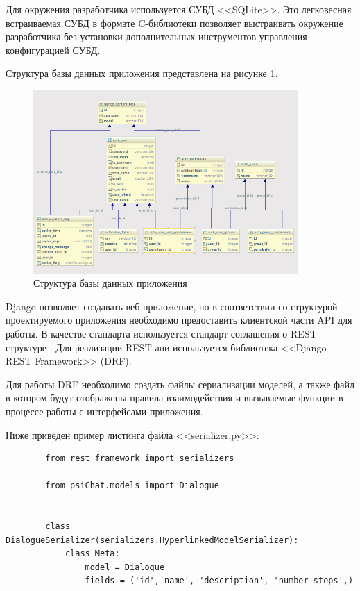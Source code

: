 Для окружения разработчика используется СУБД <<SQLite>>. Это легковесная встраиваемая СУБД в формате C-библиотеки позволяет выстраивать окружение разработчика без установки дополнительных инструментов управления конфигурацией СУБД.

Структура базы данных приложения представлена на рисунке \ref{fig:db}.

\begin{figure}[H]
    \centering
    \includegraphics[width=0.9\textwidth]{image/db_diagram.png}
    \caption{Структура базы данных приложения}
    \label{fig:db}
\end{figure}

Django позволяет создавать веб-приложение, но в соответствии со структурой проектируемого приложения необходимо предоставить клиентской части API для работы. В качестве стандарта используется стандарт соглашения о REST структуре \cite{richardson2008restful}. Для реализации  REST-апи используется библиотека <<Django REST Framework>> (DRF). 

Для работы DRF необходимо создать файлы сериализации моделей, а также файл в котором будут отображены правила взаимодействия и вызываемые функции в процессе работы с интерфейсами приложения. 

Ниже приведен пример листинга файла <<serializer.py>>:

\begin{minipage}{0.9\textwidth}
        \begin{verbatim}
        from rest_framework import serializers

        from psiChat.models import Dialogue
        
        
        class DialogueSerializer(serializers.HyperlinkedModelSerializer):
            class Meta:
                model = Dialogue
                fields = ('id','name', 'description', 'number_steps',)

        \end{verbatim}
\end{minipage}\\[1.5pt]

